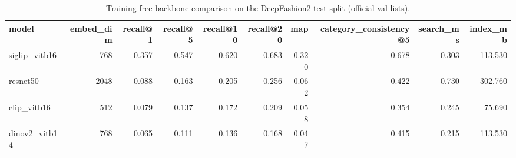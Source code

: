 \begin{table}[t]
\centering
\caption{Training-free backbone comparison on the DeepFashion2 test split (official val lists).}
\label{tab:backbones}
\begin{tabular}{lrrrrrrrrr}
\toprule
model & embed\_dim & recall@1 & recall@5 & recall@10 & recall@20 & map & category\_consistency@5 & search\_ms & index\_mb \\
\midrule
siglip\_vitb16 & 768 & 0.357 & 0.547 & 0.620 & 0.683 & 0.320 & 0.678 & 0.303 & 113.530 \\
resnet50 & 2048 & 0.088 & 0.163 & 0.205 & 0.256 & 0.062 & 0.422 & 0.730 & 302.760 \\
clip\_vitb16 & 512 & 0.079 & 0.137 & 0.172 & 0.209 & 0.058 & 0.354 & 0.245 & 75.690 \\
dinov2\_vitb14 & 768 & 0.065 & 0.111 & 0.136 & 0.168 & 0.047 & 0.415 & 0.215 & 113.530 \\
\bottomrule
\end{tabular}
\end{table}

